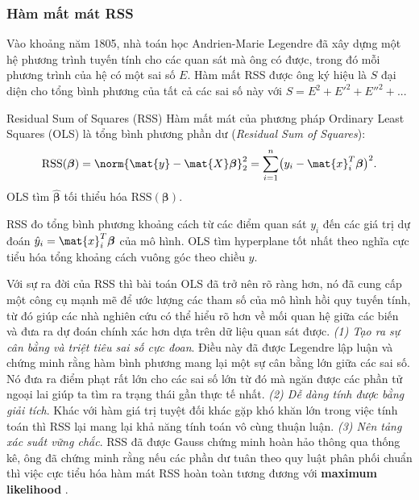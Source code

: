 \subsubsection{Hàm mất mát RSS}

Vào khoảng năm 1805, nhà toán học Andrien-Marie Legendre đã xây dựng một hệ phương trình tuyến tính cho các quan sát mà ông có được, trong đó mỗi phương trình của hệ có một sai số $E$. Hàm mất RSS được ông ký hiệu là $S$ đại diện cho tổng bình phương của tất cả các sai số này với $S = E^2 + E'^2 + E''^2 + ...$ \cite{plackett1972}
\begin{mydef}{Residual Sum of Squares (RSS)}{}
Hàm mất mát của phương pháp Ordinary Least Squares (OLS) là tổng bình phương
phần dư (\textit{Residual Sum of Squares}):
\[
    \mathrm{RSS}(\boldsymbol{\beta})
    = \norm{\mat{y} - \mat{X}\boldsymbol{\beta}}_2^2
    = \sum_{i=1}^n \bigl(y_i - \mat{x}_i^T\boldsymbol{\beta}\bigr)^2.
\]
OLS tìm $\hat{\boldsymbol{\beta}}$ tối thiểu hóa $\mathrm{RSS}(\boldsymbol{\beta})$.
\end{mydef}

\begin{note}
RSS đo tổng bình phương khoảng cách từ các điểm quan sát $y_i$ đến các giá trị
dự đoán $\hat{y}_i = \mat{x}_i^T\boldsymbol{\beta}$ của mô hình. OLS tìm
hyperplane tốt nhất theo nghĩa cực tiểu hóa tổng khoảng cách vuông góc theo
chiều $y$.
\end{note}

Với sự ra đời của RSS thì bài toán OLS đã trở nên rõ ràng hơn, nó đã cung cấp một công cụ mạnh mẽ để ước lượng các tham số của mô hình hồi quy tuyến tính, từ đó giúp các nhà nghiên cứu có thể hiểu rõ hơn về mối quan hệ giữa các biến và đưa ra dự đoán chính xác hơn dựa trên dữ liệu quan sát được. \textit{(1) Tạo ra sự cân bằng và triệt tiêu sai số cực đoan}. Điều này đã được Legendre lập luận và chứng minh rằng hàm bình phương mang lại một sự cân bằng lớn giữa các sai số. Nó đưa ra điểm phạt rất lớn cho các sai số lớn từ đó mà ngăn được các phần tử ngoại lai giúp ta tìm ra trạng thái gần thực tế nhất. \textit{(2) Dễ dàng tính được bằng giải tích}. Khác với hàm giá trị tuyệt đối khác gặp khó khăn lớn trong việc tính toán thì RSS lại mang lại khả năng tính toán vô cùng thuận luận. \textit{(3) Nên tảng xác suất vững chắc}. RSS đã được Gauss chứng minh hoàn hảo thông qua thống kê, ông đã chứng minh rằng nếu các phần dư tuân theo quy luật phân phối chuẩn thì việc cực tiểu hóa hàm mát RSS hoàn toàn tương đương với \textbf{maximum likelihood} \cite{plackett1972}.

